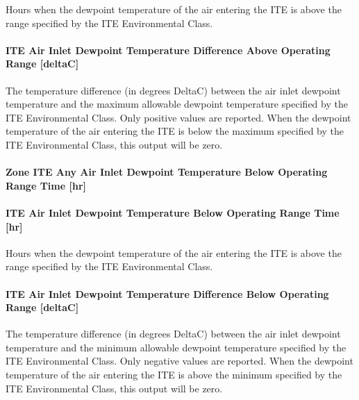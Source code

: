 Hours when the dewpoint temperature of the air entering the ITE is above the range specified by the ITE Environmental Class.

\paragraph{ITE Air Inlet Dewpoint Temperature Difference Above Operating Range {[}deltaC{]}}\label{ite-air-inlet-dewpoint-temperature-difference-above-operating-range-deltac}

The temperature difference (in degrees DeltaC) between the air inlet dewpoint temperature and the maximum allowable dewpoint temperature specified by the ITE Environmental Class. Only positive values are reported. When the dewpoint temperature of the air entering the ITE is below the maximum specified by the ITE Environmental Class, this output will be zero.

\paragraph{Zone ITE Any Air Inlet Dewpoint Temperature Below Operating Range Time {[}hr{]}}\label{zone-ite-any-air-inlet-dewpoint-temperature-below-operating-range-time-hr}

\paragraph{ITE Air Inlet Dewpoint Temperature Below Operating Range Time {[}hr{]}}\label{ite-air-inlet-dewpoint-temperature-below-operating-range-time-hr}

Hours when the dewpoint temperature of the air entering the ITE is above the range specified by the ITE Environmental Class.

\paragraph{ITE Air Inlet Dewpoint Temperature Difference Below Operating Range {[}deltaC{]}}\label{ite-air-inlet-dewpoint-temperature-difference-below-operating-range-deltac}

The temperature difference (in degrees DeltaC) between the air inlet dewpoint temperature and the minimum allowable dewpoint temperature specified by the ITE Environmental Class. Only negative values are reported. When the dewpoint temperature of the air entering the ITE is above the minimum specified by the ITE Environmental Class, this output will be zero.

